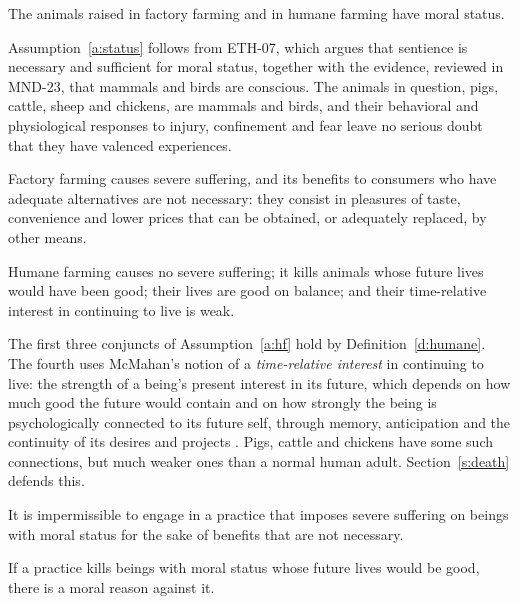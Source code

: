 \documentclass{situationist-preprint}
\begin{document}
\begin{assumption}\label{a:status}
The animals raised in factory farming and in humane farming have moral status.
\end{assumption}

Assumption~\ref{a:status} follows from ETH-07, which argues that sentience is necessary and sufficient for moral status, together with the evidence, reviewed in MND-23, that mammals and birds are conscious. The animals in question, pigs, cattle, sheep and chickens, are mammals and birds, and their behavioral and physiological responses to injury, confinement and fear leave no serious doubt that they have valenced experiences.

\begin{assumption}\label{a:ff}
Factory farming causes severe suffering, and its benefits to consumers who have adequate alternatives are not necessary: they consist in pleasures of taste, convenience and lower prices that can be obtained, or adequately replaced, by other means.
\end{assumption}

\begin{assumption}\label{a:hf}
Humane farming causes no severe suffering; it kills animals whose future lives would have been good; their lives are good on balance; and their time-relative interest in continuing to live is weak.
\end{assumption}

The first three conjuncts of Assumption~\ref{a:hf} hold by Definition~\ref{d:humane}. The fourth uses McMahan's notion of a \emph{time-relative interest} in continuing to live: the strength of a being's present interest in its future, which depends on how much good the future would contain and on how strongly the being is psychologically connected to its future self, through memory, anticipation and the continuity of its desires and projects \citep{McMahan2002}. Pigs, cattle and chickens have some such connections, but much weaker ones than a normal human adult. Section~\ref{s:death} defends this.

\begin{principle}\label{p:suffering}
It is impermissible to engage in a practice that imposes severe suffering on beings with moral status for the sake of benefits that are not necessary.
\end{principle}

\begin{principle}[Deprivation]\label{p:deprivation}
If a practice kills beings with moral status whose future lives would be good, there is a moral reason against it.
\end{principle}
\end{document}
